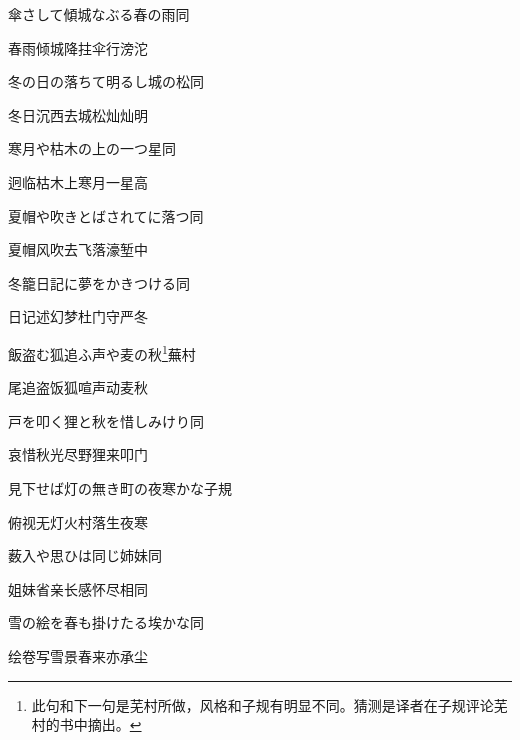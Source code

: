 \begin{haiku}
    {\FH 傘さして傾城なぶる春の雨}\hfill{\FH 同}

    {\FK 春雨倾城降拄伞行滂沱}
\end{haiku}

\begin{haiku}
    {\FH 冬の日の落ちて明るし城の松}\hfill{\FH 同}

    {\FK 冬日沉西去城松灿灿明}
\end{haiku}

\begin{haiku}
    {\FH 寒月や枯木の上の一つ星}\hfill{\FH 同}

    {\FK 迥临枯木上寒月一星高}
\end{haiku}

\begin{haiku}
    {\FH 夏帽や吹きとばされてに落つ}\hfill{\FH 同}

    {\FK 夏帽风吹去飞落濠堑中}
\end{haiku}

\begin{haiku}
    {\FH 冬籠日記に夢をかきつける}\hfill{\FH 同}

    {\FK 日记述幻梦杜门守严冬}
\end{haiku}

\begin{haiku}
    {\FH 飯盗む狐追ふ声や麦の秋\footnote{\FT 此句和下一句是芜村所做，风格和子规有明显不同。猜测是译者在子规评论芜村的书中摘出。}}\hfill{\FH 蕪村}

    {\FK 尾追盗饭狐喧声动麦秋}
\end{haiku}

\begin{haiku}
    {\FH 戸を叩く狸と秋を惜しみけり}\hfill{\FH 同}

    {\FK 哀惜秋光尽野狸来叩门}
\end{haiku}

\begin{haiku}
    {\FH 見下せば灯の無き町の夜寒かな}\hfill{\FH 子規}

    {\FK 俯视无灯火村落生夜寒}
\end{haiku}

\begin{haiku}
    {\FH 薮入や思ひは同じ姉妹}\hfill{\FH 同}

    {\FK 姐妹省亲长感怀尽相同}
\end{haiku}

\begin{haiku}
    {\FH 雪の絵を春も掛けたる埃かな}\hfill{\FH 同}

    {\FK 绘卷写雪景春来亦承尘}
\end{haiku}

